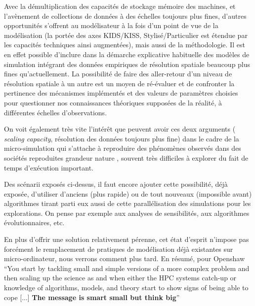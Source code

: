 Avec la démultiplication des capacités de stockage mémoire des machines, et l'avènement de collections de données à des échelles toujours plus fines, d'autres opportunités s'offrent au modélisateur à la fois d'un point de vue de la modélisation (la portée des axes KIDS/KISS, Stylisé/Particulier \autocite{Banos2013a} est étendue par les capacités techniques ainsi augmentées), mais aussi de la méthodologie. Il est en effet possible d'inclure dans la démarche explicative habituelle des modèles de simulation intégrant des données empiriques de résolution spatiale beaucoup plus fines qu'actuellement. La possibilité de faire des aller-retour d'un niveau de résolution spatiale à un autre est un moyen de ré-évaluer et de confronter la pertinence des mécanismes implémentés et des valeurs de paramètres choisies pour questionner nos connaissances théoriques supposées de la réalité, à différentes échelles d'observations.

On voit également très vite l'intérêt que peuvent avoir ces deux arguments ( \textit{scaling capacity}, résolution des données toujours plus fine) dans le cadre de la micro-simulation qui s'attache à reproduire des phénomènes observés dans des sociétés reproduites grandeur nature \autocite{Sanders2006}, souvent très difficiles à explorer du fait de temps d'exécution important.

Des scénarii exposés ci-dessus, il faut encore ajouter cette possibilité, déjà exposée, d'utiliser d'anciens (plus rapide) ou de tout nouveaux (impossible avant) algorithmes tirant parti eux aussi de cette parallélisation des simulations pour les explorations. On pense par exemple aux analyses de sensibilités, aux algorithmes évolutionnaires, etc.

En plus d'offrir une solution relativement pérenne, cet état d'esprit n'impose pas forcément le remplacement de pratiques de modélisation déjà existantes sur micro-ordinateur, nous verrons comment plus tard. En résumé, pour Openshaw \foreignquote{english}{You start by tackling small and simple versions of a more complex problem and then scaling up the science as and when either the HPC systems catch-up or knowledge of algorithms, models, and theory start to show signs of being able to cope [...] \textbf{The message is smart small but think big}}

